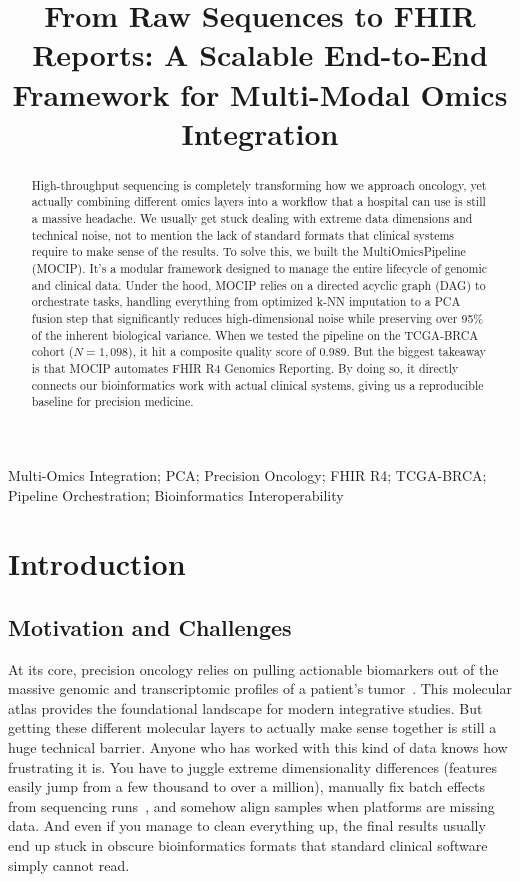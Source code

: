 \documentclass[conference,flushend]{iaria} %
\title{From Raw Sequences to FHIR Reports: A Scalable End-to-End Framework for Multi-Modal Omics Integration}
\author{
  \IEEEauthorblockN{Nidhal Zitouni\IEEEauthorrefmark{1} and Mohsen Maraoui\IEEEauthorrefmark{1}}
  \IEEEauthorblockA{
    \IEEEauthorrefmark{1}Department of Computer Science\\
    Faculty of Sciences of Monastir\\
    Monastir, Tunisia\\
    e-mail: {\tt zitouninidhal@fsm.u-monastir.tn, mohsen.maraoui@fsm.rnu.tn}
  }
}
\begin{document}
\maketitle
\sloppy

\begin{abstract}
High-throughput sequencing is completely transforming how we approach oncology, yet actually combining different omics layers into a workflow that a hospital can use is still a massive headache. We usually get stuck dealing with extreme data dimensions and technical noise, not to mention the lack of standard formats that clinical systems require to make sense of the results. To solve this, we built the MultiOmicsPipeline (MOCIP). It's a modular framework designed to manage the entire lifecycle of genomic and clinical data. Under the hood, MOCIP relies on a directed acyclic graph (DAG) to orchestrate tasks, handling everything from optimized k-NN imputation to a PCA fusion step that significantly reduces high-dimensional noise while preserving over 95\% of the inherent biological variance. When we tested the pipeline on the TCGA-BRCA cohort ($N=1,098$), it hit a composite quality score of 0.989. But the biggest takeaway is that MOCIP automates FHIR R4 Genomics Reporting. By doing so, it directly connects our bioinformatics work with actual clinical systems, giving us a reproducible baseline for precision medicine.
\end{abstract}

\begin{IEEEkeywords}
Multi-Omics Integration; PCA; Precision Oncology; FHIR R4; TCGA-BRCA; Pipeline Orchestration; Bioinformatics Interoperability
\end{IEEEkeywords}

\section{Introduction}

\subsection{Motivation and Challenges}
At its core, precision oncology relies on pulling actionable biomarkers out of the massive genomic and transcriptomic profiles of a patient's tumor~\cite{tomczak2015}. This molecular atlas provides the foundational landscape for modern integrative studies. But getting these different molecular layers to actually make sense together is still a huge technical barrier. Anyone who has worked with this kind of data knows how frustrating it is. You have to juggle extreme dimensionality differences (features easily jump from a few thousand to over a million), manually fix batch effects from sequencing runs~\cite{leek2010}, and somehow align samples when platforms are missing data. And even if you manage to clean everything up, the final results usually end up stuck in obscure bioinformatics formats that standard clinical software simply cannot read.
\end{document}
